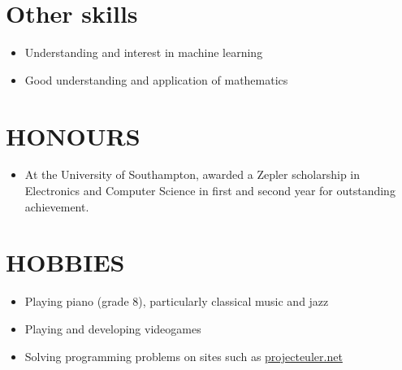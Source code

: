 \documentclass[margin]{res}
\begin{document}
\begin{resume}
\normalsize{\section{Other skills}}
\begin{itemize}
\item Understanding and interest in machine learning
\item Good understanding and application of mathematics
\end{itemize}

\section{HONOURS}
\begin{itemize}
\item At the University of Southampton, awarded a Zepler scholarship in
Electronics and Computer Science in first and second year for outstanding
achievement.
\end{itemize}

\section{HOBBIES}
\begin{itemize}
\item Playing piano (grade 8), particularly classical music and jazz
\item Playing and developing videogames
\item Solving programming problems on sites such as
\href{https://projecteuler.net/}{projecteuler.net}
\end{itemize}

\end{resume}
\end{document}
